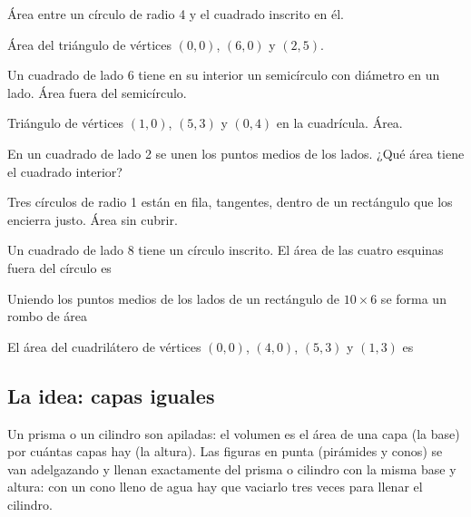 \taller
{}
\begin{ejercicios}
\item Área entre un círculo de radio 4 y el cuadrado inscrito en él. 
\item Área del triángulo de vértices $(0, 0)$, $(6, 0)$ y $(2, 5)$. 
\item Un cuadrado de lado 6 tiene en su interior un semicírculo con diámetro en un lado. Área fuera del semicírculo. 
\end{ejercicios}
\begin{ejercicios}
\item Triángulo de vértices $(1, 0)$, $(5, 3)$ y $(0, 4)$ en la cuadrícula. Área. 
\item En un cuadrado de lado 2 se unen los puntos medios de los lados. ¿Qué área tiene el cuadrado interior? 
\item Tres círculos de radio 1 están en fila, tangentes, dentro de un rectángulo que los encierra justo. Área sin cubrir. 
\end{ejercicios}
\begin{ejercicios}
\item Un cuadrado de lado 8 tiene un círculo inscrito. El área de las cuatro esquinas fuera del círculo es
\item Uniendo los puntos medios de los lados de un rectángulo de $10 \times 6$ se forma un rombo de área
\item El área del cuadrilátero de vértices $(0, 0)$, $(4, 0)$, $(5, 3)$ y $(1, 3)$ es
\end{ejercicios}

\bitacora


\subsection{La idea: capas iguales}
Un prisma o un cilindro son  apiladas: el volumen es el área de una capa (la base) por cuántas capas
hay (la altura). Las figuras en punta (pirámides y conos) se van adelgazando y llenan exactamente  del
prisma o cilindro con la misma base y altura: con un cono lleno de agua hay que vaciarlo tres veces para llenar el
cilindro.

